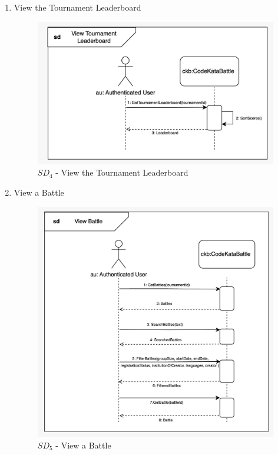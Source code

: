 \begin{enumerate}
    \item View the Tournament Leaderboard
    \begin{figure}[H]
        \centering
        \includegraphics[scale=0.2]{Images/sequence_diagrams/SD-view_tournament_leaderboard.jpeg}
        \caption{$SD_{4}$ - View the Tournament Leaderboard}
    \end{figure}
    \newpage
    \item View a Battle
    \begin{figure}[H]
        \centering
        \includegraphics[scale=0.2]{Images/sequence_diagrams/SD-view_battle.jpeg}
        \caption{$SD_{5}$ - View a Battle}

\end{figure}
\end{enumerate}
